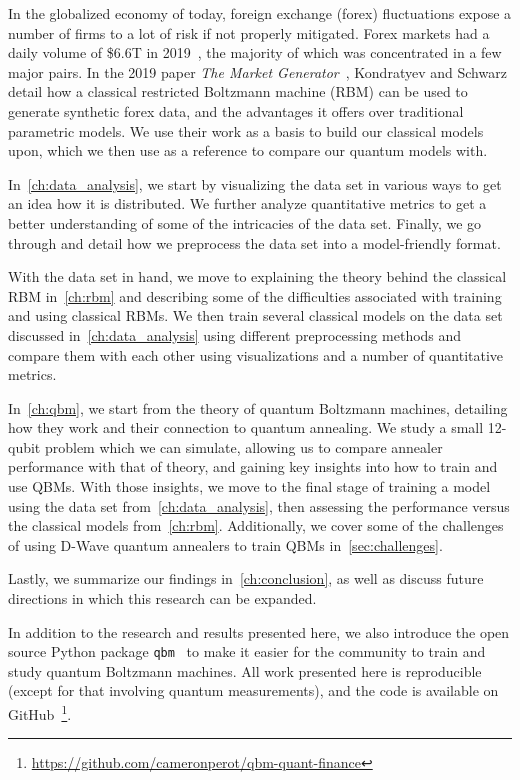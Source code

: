 In the globalized economy of today, foreign exchange (forex) fluctuations expose a number of firms to a lot of risk if not properly mitigated.
Forex markets had a daily volume of \$6.6T in 2019~\cite{bis_2019}, the majority of which was concentrated in a few major pairs.
In the 2019 paper \textit{The Market Generator}~\cite{kondratyev_2019}, Kondratyev and Schwarz detail how a classical restricted Boltzmann machine (RBM) can be used to generate synthetic forex data, and the advantages it offers over traditional parametric models.
We use their work as a basis to build our classical models upon, which we then use as a reference to compare our quantum models with.

In~\cref{ch:data_analysis}, we start by visualizing the data set in various ways to get an idea how it is distributed.
We further analyze quantitative metrics to get a better understanding of some of the intricacies of the data set.
Finally, we go through and detail how we preprocess the data set into a model-friendly format.

With the data set in hand, we move to explaining the theory behind the classical RBM in~\cref{ch:rbm} and describing some of the difficulties associated with training and using classical RBMs.
We then train several classical models on the data set discussed in~\cref{ch:data_analysis} using different preprocessing methods and compare them with each other using visualizations and a number of quantitative metrics.

In~\cref{ch:qbm}, we start from the theory of quantum Boltzmann machines, detailing how they work and their connection to quantum annealing.
We study a small 12-qubit problem which we can simulate, allowing us to compare annealer performance with that of theory, and gaining key insights into how to train and use QBMs.
With those insights, we move to the final stage of training a model using the data set from~\cref{ch:data_analysis}, then assessing the performance versus the classical models from~\cref{ch:rbm}.
Additionally, we cover some of the challenges of using D-Wave quantum annealers to train QBMs in~\cref{sec:challenges}.

Lastly, we summarize our findings in~\cref{ch:conclusion}, as well as discuss future directions in which this research can be expanded.

In addition to the research and results presented here, we also introduce the open source Python package \texttt{qbm}~\cite{qbm} to make it easier for the community to train and study quantum Boltzmann machines.
All work presented here is reproducible (except for that involving quantum measurements), and the code is available on GitHub~\footnote{\url{https://github.com/cameronperot/qbm-quant-finance}}.
